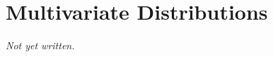 \chapter{Multivariate Distributions}\label{ch:multivariate-distributions}


\textit{Not yet written.}
